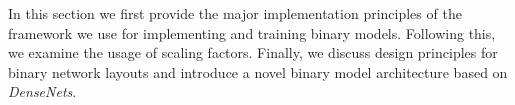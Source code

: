 \documentclass[10pt,twocolumn,letterpaper]{article}
\newcommand{\arch}[1]{\emph{#1}}
\begin{document}

In this section we first provide the major implementation principles of the framework we use for implementing and training binary models.
Following this, we examine the usage of scaling factors.
Finally, we discuss design principles for binary network layouts and introduce a novel binary model architecture based on \arch{DenseNets}.
\end{document}
